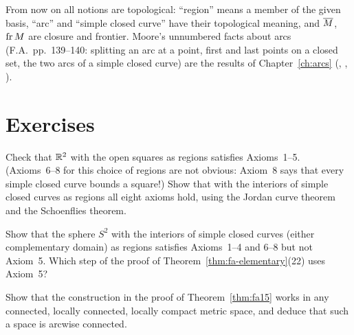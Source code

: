 
From now on all notions are topological: ``region'' means a member of the given basis, ``arc'' and
``simple closed curve'' have their topological meaning, and $\overline{M}$, $\operatorname{fr} M$ are closure and frontier.
Moore's unnumbered facts about arcs (F.A.\ pp.~139--140: splitting an arc at a point, first and last points
on a closed set, the two arcs of a simple closed curve) are the results of Chapter~\ref{ch:arcs}
(, , ).

\section*{Exercises}

\begin{exercise}
Check that $\mathbb{R}^2$ with the open squares as regions satisfies Axioms~1--5. (Axioms~6--8 for this choice of
regions are not obvious: Axiom~8 says that every simple closed curve bounds a square!) Show that with the
interiors of simple closed curves as regions all eight axioms hold, using the Jordan curve theorem and the
Schoenflies theorem.
\end{exercise}

\begin{exercise}
Show that the sphere $S^2$ with the interiors of simple closed curves (either complementary domain) as
regions satisfies Axioms~1--4 and 6--8 but not Axiom~5. Which step of the proof of Theorem~\ref{thm:fa-elementary}(22)
uses Axiom~5?
\end{exercise}

\begin{exercise}
Show that the construction in the proof of Theorem~\ref{thm:fa15} works in any connected, locally connected,
locally compact metric space, and deduce that such a space is arcwise connected.
\end{exercise}

